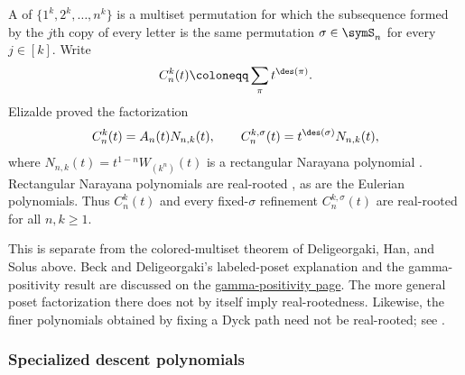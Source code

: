 \begin{example*}
A \label{canonPermutation} of
$\{1^k,2^k,\dotsc,n^k\}$ is a multiset permutation for which the subsequence
formed by the $j$th copy of every letter is the same permutation
$\sigma\in\symS_n$ for every $j\in[k]$.
Write
\[
 C_n^k(t)\coloneqq\sum_{\pi}t^{\des(\pi)}.
\]
Elizalde proved the factorization
\[
 C_n^k(t)=A_n(t)N_{n,k}(t),
 \qquad
 C_n^{k,\sigma}(t)=t^{\des(\sigma)}N_{n,k}(t),
\]
where $N_{n,k}(t)=t^{1-n}W_{(k^n)}(t)$ is a rectangular Narayana
polynomial \cite[Eq.~(5) and Thm.~3.1]{Elizalde2025Canon}.
Rectangular Narayana polynomials are real-rooted
\cite[Thm.~3.1]{ChenYangZhang2018Rectangular}, as are the Eulerian
polynomials.  Thus $C_n^k(t)$ and every fixed-$\sigma$ refinement
$C_n^{k,\sigma}(t)$ are real-rooted for all $n,k\geq1$.

This is separate from the colored-multiset theorem of Deligeorgaki, Han, and
Solus above.  Beck and Deligeorgaki's labeled-poset explanation and the
gamma-positivity result are discussed on the
\hyperref[gammaPositivity]{gamma-positivity page}.
The more general poset factorization there does not by itself imply
real-rootedness.  Likewise, the finer polynomials obtained by fixing a Dyck
path need not be real-rooted; see
\cite[Remark~3.3]{DeligeorgakiMenon2026x}.
\end{example*}

\subsubsection[specializedDescentPolynomialsRealRooted]{Specialized descent polynomials}

